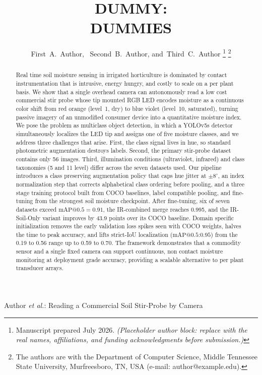 ﻿\documentclass[journal]{IEEEtran}
\begin{document}
\title{DUMMY: \\
DUMMIES}

\author{First~A.~Author,~
        Second~B.~Author,
        and~Third~C.~Author%
\thanks{Manuscript prepared July 2026. \emph{(Placeholder author block: replace with the real names, affiliations, and funding acknowledgments before submission.)}}
\thanks{The authors are with the Department of Computer Science, Middle Tennessee State University, Murfreesboro, TN, USA (e-mail: author@example.edu).}}

%
{Author \MakeLowercase{\textit{et al.}}: Reading a Commercial Soil Stir-Probe by Camera}

\maketitle

\begin{abstract}
Real time soil moisture sensing in irrigated horticulture is dominated by contact instrumentation that is intrusive, energy hungry, and costly to scale on a per plant basis. We show that a single overhead camera can autonomously read a low cost commercial stir probe whose tip mounted RGB LED encodes moisture as a continuous color shift from red orange (level~1, dry) to blue violet (level~10, saturated), turning passive imagery of an unmodified consumer device into a quantitative moisture index. We pose the problem as multiclass object detection, in which a YOLOv5s detector simultaneously localizes the LED tip and assigns one of five moisture classes, and we address three challenges that arise. First, the class signal lives in hue, so standard photometric augmentation destroys labels. Second, the primary stir-probe dataset contains only 56 images. Third, illumination conditions (ultraviolet, infrared) and class taxonomies (5  and 11 level) differ across the seven datasets used. Our pipeline introduces a class preserving augmentation policy that caps hue jitter at $\pm 8^{\circ}$, an index normalization step that corrects alphabetical class ordering before pooling, and a three stage training protocol built from COCO baselines, label compatible pooling, and fine-tuning from the strongest soil moisture checkpoint. After fine-tuning, six of seven datasets exceed $\text{mAP@0.5}=0.91$, the IR-combined merge reaches 0.995, and the IR-Soil-Only variant improves by 43.9 points over its COCO baseline. Domain specific initialization removes the early validation loss spikes seen with COCO weights, halves the time to peak accuracy, and lifts strict-IoU localization ($\text{mAP@0.5{:}0.95}$) from the 0.19 to 0.56 range up to 0.59 to 0.70. The framework demonstrates that a commodity sensor and a single fixed camera can support continuous, non contact moisture monitoring at deployment grade accuracy, providing a scalable alternative to per plant transducer arrays.
\end{abstract}
\end{document}

